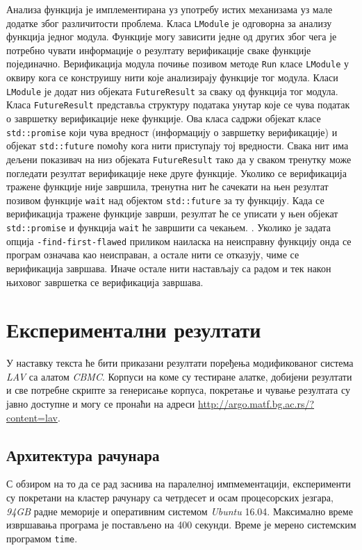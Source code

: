 \documentclass[12pt,oneside]{memoir}
\begin{document}
Анализа функција је имплементирана уз употребу истих механизама уз мале додатке због различитости проблема.   
 Класа \texttt{LModule} је одговорна за анализу функција једног модула. Функције могу зависити једне од других због чега је потребно чувати информације о резултату верификације сваке функције појединачно. Верификација модула почиње позивом методе \texttt{Run} класе \texttt{LModule} у оквиру кога се конструишу нити које анализирају функције тог модула. Класи \texttt{LModule} је додат низ објеката \texttt{FutureResult} за сваку од функција тог модула. Класа \texttt{FutureResult} представља структуру података унутар које се чува податак о завршетку верификације неке функције. Ова класа садржи објекат класе \texttt{std::promise}  који чува вредност (информацију о завршетку верификације) и објекат \texttt{std::future} помоћу кога нити приступају тој вредности. Свака нит има дељени показивач на низ објеката \texttt{FutureResult} тако да у сваком тренутку може погледати резултат верификације неке друге функције. Уколико се верификација тражене функције није завршила, тренутна нит ће сачекати на њен резултат позивом функције \texttt{wait} над објектом \texttt{std::future} за ту функцију. Када се верификација тражене функције заврши, резултат ће се уписати у њен објекат \texttt{std::promise} и функција \texttt{wait} ће завршити са чекањем. . Уколико је задата опција \texttt{-find-first-flawed} приликом наиласка на неисправну функцију онда се програм означава као неисправан, а остале нити се отказују, чиме се верификација завршава. Иначе остале нити настављају са радом и тек након њиховог завршетка се верификација завршава.

\chapter{Експериментални резултати}

У наставку текста ће бити приказани резултати поређења модификованог система \textit{LAV} са алатом \textit{CBMC}. Корпуси на коме су тестиране алатке, добијени резултати и све потребне скрипте за генерисање корпуса, покретање и чување резултата су јавно доступне и могу се пронаћи на адреси \url{http://argo.matf.bg.ac.rs/?content=lav}.


  \section{Архитектура рачунара}
  
  С обзиром на то да се рад заснива на паралелној импмементацији, експерименти су покретани на кластер рачунару са четрдесет и осам процесорских језгара, \textit{94GB} радне меморије и оперативним системом \textit{Ubuntu} 16.04. Максимално време извршавања програма је постављено на 400 секунди. Време је мерено системским програмом \texttt{time}.
  
\end{document}
